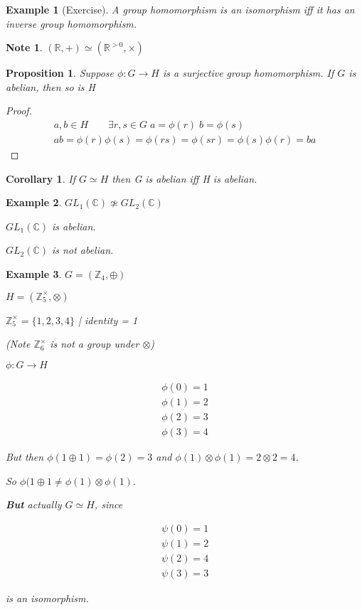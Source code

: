 \documentclass[11pt, oneside]{book}
\theoremstyle{break}
\newtheorem*{proof}{Proof}
\newtheorem{crly}{Corollary}[section]
\newtheorem{propo}{Proposition}[section]
\newtheorem*{note}{Note}
\newtheorem{eg}{Example}[section]
\newcommand{\bb}[1]{\mathbb{#1}}			%
\begin{document}
\begin{eg}[Exercise]
    A group homomorphism is an isomorphism iff it has an inverse group homomorphism.
\end{eg}

\begin{note}
    $(\bb{R}, +) \simeq (\bb{R}^{> 0}, \times)$
\end{note}

\begin{propo}\label{propo_5}
    Suppose $\phi : G \to H$ is a surjective group homomorphism. If $G$ is abelian, then so is H
\end{propo}

\begin{proof}
    \begin{gather*}
        a, b \in H \qquad \exists r, s \in G \; a = \phi(r) \; b = \phi(s) \\
        ab = \phi(r)\phi(s) = \phi(rs) = \phi(sr) = \phi(s)\phi(r) = ba
    \end{gather*}
\end{proof}

\begin{crly}
    If $G \simeq H$ then G is abelian iff H is abelian.
\end{crly}

\begin{eg}
    $GL_1(\bb{C}) \not\simeq GL_2(\bb{C})$

    $GL_1(\bb{C})$ is abelian.

    $GL_2(\bb{C})$ is not abelian.
\end{eg}

\begin{eg}
    $G = (\bb{Z}_4, \oplus)$

    $H = (\bb{Z}_5^\times, \otimes)$

    $\bb{Z}_5^\times = \{1, 2, 3, 4\}$ | identity = 1

    (Note $\bb{Z}_6^\times$ is not a group under $\otimes$)

    $\phi: G \to H$

    \begin{gather*}
        \phi(0) = 1 \\
        \phi(1) = 2 \\
        \phi(2) = 3 \\
        \phi(3) = 4
    \end{gather*}

    But then $\phi(1 \oplus 1) = \phi(2) = 3$ and $\phi(1) \otimes \phi(1) = 2 \otimes 2 = 4$.

    So $\phi(1 \oplus 1 \neq \phi(1) \otimes \phi(1)$.

    \textbf{But} actually $G \simeq H$, since

    \begin{gather*}
        \psi(0) = 1 \\
        \psi(1) = 2 \\
        \psi(2) = 4 \\
        \psi(3) = 3
    \end{gather*}

    is an isomorphism.
\end{eg}
\end{document}
